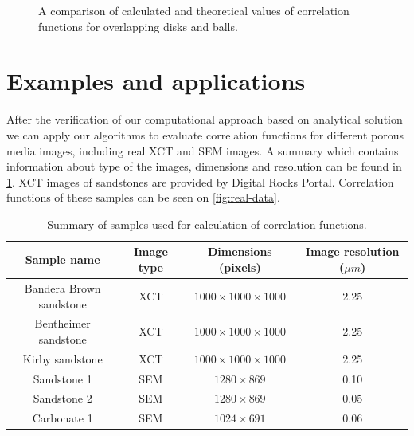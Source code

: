 \documentclass[reprint,amsmath,amssymb,aps,pre,showkeys,showpacs,nofootinbib]{revtex4-1}
\begin{document}
\begin{figure}[tp]
{    \label{fig:ps}}
  \hfill
  \caption[]{A comparison of calculated and theoretical values of correlation
    functions for overlapping disks and balls.}
  \label{fig:verification}
\end{figure}

\section{Examples and applications}
\label{sec:examples}
After the verification of our computational approach based on analytical
solution we can apply our algorithms to evaluate correlation functions for
different porous media images, including real XCT and SEM images. A summary
which contains information about type of the images, dimensions and resolution
can be found in \cref{tab:samples}. XCT images of sandstones are provided by
Digital Rocks Portal\cite{DigitalRocks}. Correlation functions of these samples
can be seen on \cref{fig:real-data}.

\begin{table}[!pt]
  \centering
  \begin{ruledtabular}
    \begin{tabular}{|c|c|c|c|}
      Sample name & Image type & Dimensions (pixels) & Image resolution ($\mu m$) \\
      \hline
      Bandera Brown sandstone & XCT & $1000 \times 1000 \times 1000$ & 2.25 \\
      Bentheimer sandstone    & XCT & $1000 \times 1000 \times 1000$ & 2.25 \\
      Kirby sandstone         & XCT & $1000 \times 1000 \times 1000$ & 2.25 \\
      Sandstone 1 & SEM &  $1280 \times 869$ & 0.10 \\
      Sandstone 2 & SEM &  $1280 \times 869$ & 0.05 \\
      Carbonate 1 & SEM &  $1024 \times 691$ & 0.06
    \end{tabular}
  \end{ruledtabular}
  \caption{Summary of samples used for calculation of correlation functions.}
  \label{tab:samples}
\end{table}
\end{document}

